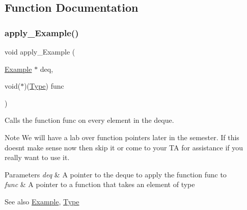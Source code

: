 \subsection{Function Documentation}
\mbox{\label{group__DEQUE_ga582c40f070af171e4c98455d7d6fd305}} 
\subsubsection{\texorpdfstring{apply\+\_\+\+Example()}{apply\_Example()}}
{\footnotesize\ttfamily void apply\+\_\+\+Example (\begin{DoxyParamCaption}\item[{\hyperlink{structExample}{Example} $\ast$}]{deq,  }\item[{void($\ast$)(\hyperlink{group__DEQUE_gac9c83c2070eb6b5891cf742b90f54c68}{Type})}]{func }\end{DoxyParamCaption})}



Calls the function func on every element in the deque. 

\begin{DoxyNote}{Note}
We will have a lab over function pointers later in the semester. If this doesn\textquotesingle{}t make sense now then skip it or come to your TA for assistance if you really want to use it.
\end{DoxyNote}

\begin{DoxyParams}{Parameters}
{\em deq} & A pointer to the deque to apply the function func to\\
\hline
{\em func} & A pointer to a function that takes an element of type\\
\hline
\end{DoxyParams}
\begin{DoxySeeAlso}{See also}
\hyperlink{structExample}{Example}, \hyperlink{group__DEQUE_gac9c83c2070eb6b5891cf742b90f54c68}{Type} 
\end{DoxySeeAlso}
\mbox{\label{group__DEQUE_ga0214e3a819ca3e1ec44d2f60d7c28f7b}} 
